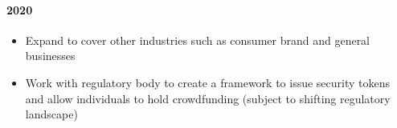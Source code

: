 \documentclass[letterpaper,11pt]{article}
\begin{document}
\paragraph{2020}
\begin{itemize}
\itemsep0em
\item Expand to cover other industries such as consumer brand and general businesses
\item Work with regulatory body to create a framework to issue security tokens and allow individuals to hold crowdfunding (subject to shifting regulatory landscape)
\end{itemize}

\newpage



\end{document}
